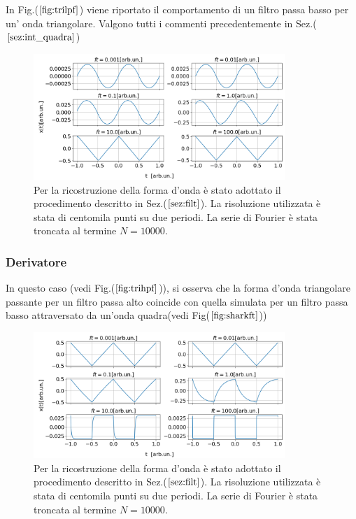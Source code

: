 \documentclass{article}
\begin{document}
            In Fig.($\ref{fig:trilpf}$) viene riportato il comportamento di un filtro passa
            basso per un' onda triangolare. Valgono tutti i commenti precedentemente in 
            Sez.($\ref{sez:int_quadra}$)
            \begin{figure}[H]
                \centering
                \includegraphics[width=0.85\textwidth]{integ_trian.png} %
                \caption{Per la ricostruzione della forma d'onda è stato adottato 
                il procedimento descritto in Sez.($\ref{sez:filt}$).
                La risoluzione utilizzata è stata di centomila punti su due periodi.
                La serie di Fourier è stata troncata al termine $N=10000$.}
                \label{fig:trilpf}
            \end{figure}
        \subsubsection{Derivatore}
            In questo caso (vedi Fig.($\ref{fig:trihpf}$)), si osserva che la forma d'onda 
            triangolare passante per un filtro passa alto coincide con quella simulata 
            per un filtro passa basso attraversato da un'onda quadra(vedi Fig($\ref{fig:sharkft}$))
                \begin{figure}[H]
                    \centering
                    \includegraphics[width=0.85\textwidth]{der_trian.png} %
                    \caption{Per la ricostruzione della forma d'onda è stato adottato 
                    il procedimento descritto in Sez.($\ref{sez:filt}$).
                    La risoluzione utilizzata è stata di centomila punti su due periodi.
                    La serie di Fourier è stata troncata al termine $N=10000$.}
                    \label{fig:trihpf}
                \end{figure}
\end{document}

